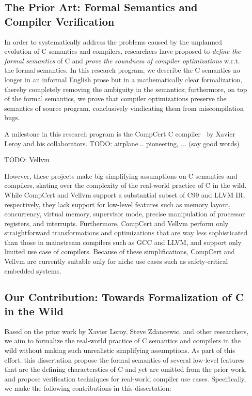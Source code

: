 \subsection{The Prior Art: Formal Semantics and Compiler Verification}

In order to systematically address the problems caused by the unplanned evolution of C semantics and
compilers, researchers have proposed to \emph{define the formal semantics} of C and \emph{prove the
  soundness of compiler optimizations} w.r.t. the formal semantics.  In this research program, we
describe the C semantics no longer in an informal English prose but in a mathematically clear
formalization, thereby completely removing the ambiguity in the semantics; furthermore, on top of
the formal semantics, we prove that compiler optimizations preserve the semantics of source program,
conclusively vindicating them from miscompilation bugs.

A milestone in this research program is the CompCert C compiler~\cite{compcert} by Xavier Leroy and
his collaborators.  TODO: airplane...  pioneering, ... (say good words)

TODO: Vellvm

However, these projects make big simplifying assumptions on C semantics and compilers, skating over
the complexity of the real-world practice of C in the wild.  While CompCert and Vellvm support a
substantial subset of C99 and LLVM IR, respectively, they lack support for low-level features such
as memory layout, concurrency, virtual memory, supervisor mode, precise manipulation of processor
registers, and interrupts.  Furthermore, CompCert and Vellvm perform only straightforward
transformations and optimizations that are way less sophisticated than those in mainstream compilers
such as GCC and LLVM, and support only limited use case of compilers.  Because of these
simplifications, CompCert and Vellvm are currently suitable only for niche use cases such as
safety-critical embedded systems.


\subsection{Our Contribution: Towards Formalization of C in the Wild}

Based on the prior work by Xavier Leroy, Steve Zdancewic, and other researchers, we aim to formalize
the real-world practice of C semantics and compilers in the wild without making such unrealistic
simplifying assumptions.  As part of this effort, this dissertation propose the formal semantics of
several low-level features that are the defining characterstics of C and yet are omitted from the
prior work, and propose verification techniques for real-world compiler use cases.  Specifically, we
make the following contributions in this dissertation:

